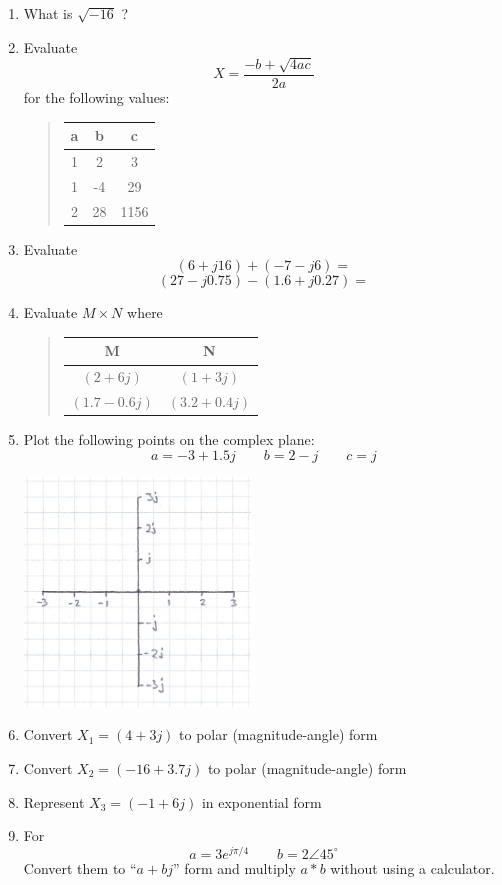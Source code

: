 \begin{enumerate}

\item  What is $\sqrt{-16}$ ?

\item  Evaluate
\[
X = \frac{-b + \sqrt{4ac}}{2a}
\]
for the following values:
\begin{quotation}
\begin{tabular} {c|c|c}
a&b&c  \\ \hline
1&2&3 \\
1&-4&29\\
2&28&1156
\end{tabular}
\end{quotation}


\item  Evaluate
\[
(6+j16) + (-7-j6) =
\]
\[
(27-j0.75) - (1.6+j0.27) =
\]


\item  Evaluate  $M\times N$ where

\begin{quotation}
\begin{tabular} {c|c}
M&N \\ \hline
$(2+6j)$	&	$(1+3j)$   	\\
$(1.7-0.6j)$    &	$(3.2+0.4j)$	\\
\end{tabular}
\end{quotation}


\item  Plot the following points on the complex plane:
\[
a = -3+1.5j \qquad b = 2-j \qquad c = j
\]


\includegraphics[width=6cm]{figsapdx/00926a.png}



\item  Convert $X_1=(4+3j)$ to polar (magnitude-angle) form


\item  Convert $X_2=(-16+3.7j)$ to polar (magnitude-angle) form


\item  Represent $X_3 = (-1+6j)$ in exponential form

\item  For
\[
a = 3e^{j\pi/4} \qquad b = 2\angle{45^\circ}
\]
Convert them to ``$a+bj$'' form and multiply $a*b$ without using a calculator.

\end{enumerate}








